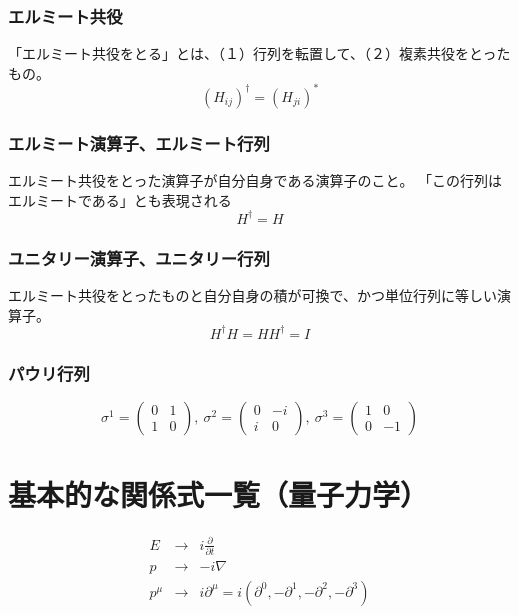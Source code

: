 \documentclass[a4paper,11pt,uplatex]{jsreport}
\begin{document}
\subsubsection{エルミート共役}
「エルミート共役をとる」とは、（１）行列を転置して、（２）複素共役をとったもの。
\begin{equation}
  (H_{ij})^{\dagger}=(H_{ji})^{*}
\end{equation}


\subsubsection{エルミート演算子、エルミート行列}
エルミート共役をとった演算子が自分自身である演算子のこと。
「この行列はエルミートである」とも表現される
\begin{equation}
H^{\dagger}=H
\end{equation}

\subsubsection{ユニタリー演算子、ユニタリー行列}
エルミート共役をとったものと自分自身の積が可換で、かつ単位行列に等しい演算子。
\begin{equation}
H^{\dagger}H=HH^{\dagger}=I
\end{equation}

\subsubsection{パウリ行列}
\begin{equation}
  \sigma^1 = 
  \left(
    \begin{array}{cc}
      0 & 1 \\
      1 & 0 
    \end{array}
  \right),~
  \sigma^2 = 
  \left(
    \begin{array}{cc}
      0 & -i \\
      i & 0 
    \end{array}
  \right),~
  \sigma^3 = 
  \left(
    \begin{array}{cc}
      1 & 0 \\
      0 & -1 
    \end{array}
  \right)
\end{equation}

\section{基本的な関係式一覧（量子力学）}
\begin{eqnarray}
  E &\to& i\frac{\partial}{\partial t} \\
  p &\to& -i\nabla \\
  p^{\mu} &\to& i\partial^{\mu} = i(\partial^0, -\partial^1, -\partial^2, -\partial^3)
\end{eqnarray}
\end{document}
